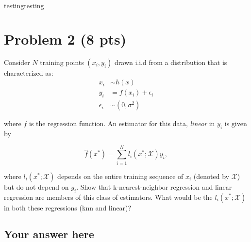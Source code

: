 \documentclass{article}
\begin{document}
testingtesting


\section*{Problem 2 (8 pts)}

Consider $N$ training points $(x_i, y_i)$ drawn i.i.d from a distribution that is characterized as: 
\begin{align}
x_i &\sim h(x) \\
y_i &= f(x_i) + \epsilon_i \\
\epsilon_i &\sim (0, \sigma^2) 
\end{align}

where $f$ is the regression function. An estimator for this data, \emph{linear} in $y_i$ is given by

\begin{equation}
    \hat f(x^*) = \sum_{i=1}^{N} l_i(x^* ; \mathcal{X})y_i, 
\end{equation}

where $l_i(x^*; \mathcal{X})$ depends on the entire training sequence of $x_i$ (denoted by $\mathcal{X}$)  but do not depend on $y_i$. Show that k-nearest-neighbor regression and linear regression are members of this class of estimators. What would be the $l_i(x^* ; \mathcal{X})$ in both these regressions (knn and linear)? 


\subsection*{Your answer here}
\end{document}
